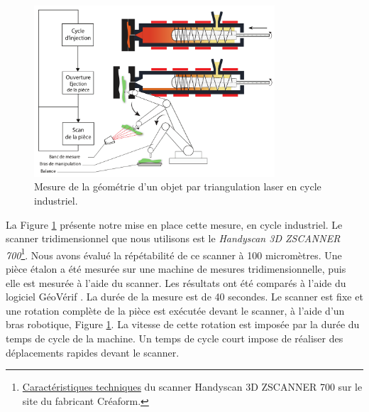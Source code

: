 \begin{figure}[tbhp]
	\centering
	\includegraphics[width=0.8\textwidth]{../Chap2/Figures/online_scan.pdf}
	\caption{Mesure de la géométrie d'un objet par triangulation laser en cycle industriel.}
	\label{fig:online_scan}
\end{figure}
La Figure \ref{fig:online_scan} présente notre mise en place cette mesure, en cycle industriel.
Le scanner tridimensionnel que nous utilisons est le \textit{Handyscan 3D ZSCANNER 700}\footnote{\href{https://www.creaform3d.com/fr/soutien-la-clientele/produits-retires/handyscan-3d-de-1re-generation-zscanner-700}{Caractéristiques techniques} du scanner Handyscan 3D ZSCANNER 700 sur le site du fabricant Créaform.}.
Nous avons évalué la répétabilité de ce scanner à 100 micromètres.
Une pièce étalon a été mesurée sur une machine de mesures tridimensionnelle, puis elle est mesurée à l'aide du scanner.
Les résultats ont été comparés à l'aide du logiciel GéoVérif \cite{pairel_maitrise_2016}.
La durée de la mesure est de 40 secondes.
Le scanner est fixe et une rotation complète de la pièce est exécutée devant le scanner, à l'aide d'un bras robotique, Figure \ref{fig:online_scan}.
La vitesse de cette rotation est imposée par la durée du temps de cycle de la machine.
Un temps de cycle court impose de réaliser des déplacements rapides devant le scanner.

